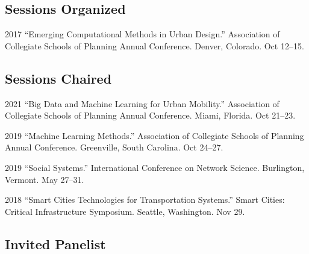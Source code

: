 \documentclass[12pt,letterpaper]{report}
\begin{document}
    \subsection*{Sessions Organized}

    \begin{tablist}

        \item[2017] \tab{}\enquote{Emerging Computational Methods in Urban Design.} Association of Collegiate Schools of Planning Annual Conference. Denver, Colorado. Oct 12--15.

    \end{tablist}

    \subsection*{Sessions Chaired}

    \begin{tablist}

        \item[2021] \tab{}\enquote{Big Data and Machine Learning for Urban Mobility.} Association of Collegiate Schools of Planning Annual Conference. Miami, Florida. Oct 21--23.

        \item[2019] \tab{}\enquote{Machine Learning Methods.} Association of Collegiate Schools of Planning Annual Conference. Greenville, South Carolina. Oct 24--27.

        \item[2019] \tab{}\enquote{Social Systems.} International Conference on Network Science. Burlington, Vermont. May 27--31.

        \item[2018] \tab{}\enquote{Smart Cities Technologies for Transportation Systems.} Smart Cities: Critical Infrastructure Symposium. Seattle, Washington. Nov 29.

    \end{tablist}

    \subsection*{Invited Panelist}
\end{document}
